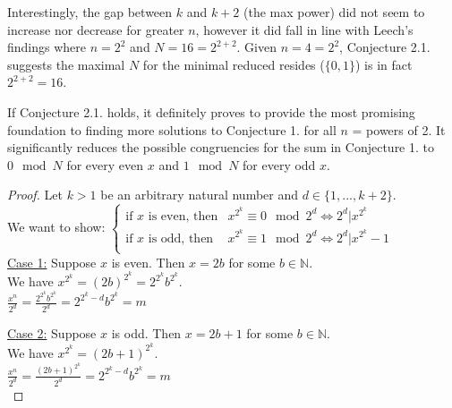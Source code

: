 \documentclass{article}
\begin{document}
\begin{flushleft}
    \vspace{.1in}
    
    Interestingly, the gap between $k$ and $k+2$ (the max power) did not seem to increase nor decrease for greater $n$, however it did fall in line with Leech's \cite{leech} findings where $n=2^2$ and $N=16=2^{2+2}$. Given $n=4=2^2$, Conjecture 2.1. suggests the maximal $N$ for the minimal reduced resides ($\{0,1\}$) is in fact $2^{2+2}=16$.

    \vspace{.1in}

    If Conjecture 2.1. holds, it definitely proves to provide the most promising foundation to finding more solutions to Conjecture 1. for all $n$ = powers of 2. It significantly reduces the possible congruencies for the sum in Conjecture 1. to $0\mod N$ for every even $x$ and $1\mod N$ for every odd $x$.

    \vspace{.1in}

    \begin{proof}
        Let $k>1$ be an arbitrary natural number and $d\in\{1,...,k+2\}$.\\
        \vspace{.1in}
        We want to show:
        $\begin{cases}
            \text{if $x$ is even, then} & x^{2^k}\equiv 0\mod 2^d \Longleftrightarrow 2^d|x^{2^k}\\
            \text{if $x$ is odd, then} & x^{2^k}\equiv 1\mod 2^d \Longleftrightarrow 2^d|x^{2^k}-1\\
        \end{cases}$\\
        \vspace{.1in}
        \underline{Case 1:} Suppose $x$ is even. Then $x=2b$ for some $b\in{\mathbb{N}}$.\\\vspace{.05in}
        We have $x^{2^k}=(2b)^{2^k}=2^{2^k}b^{2^k}$.\\\vspace{.05in}
        \hspace{.2in} $\displaystyle\frac{x^n}{2^d}=\frac{2^{2^k}b^{2^k}}{2^d}=2^{2^k-d}b^{2^k}=m$\\

        \vspace{.1in}

        \underline{Case 2:} Suppose $x$ is odd. Then $x=2b+1$ for some $b\in{\mathbb{N}}$.\\\vspace{.05in}
        We have $x^{2^k}=(2b+1)^{2^k}$.\\\vspace{.05in}
        \hspace{.2in} $\displaystyle\frac{x^n}{2^d}=\frac{(2b+1)^{2^k}}{2^d}=2^{2^k-d}b^{2^k}=m$\\
        

\end{proof}
\end{flushleft}
\end{document}

